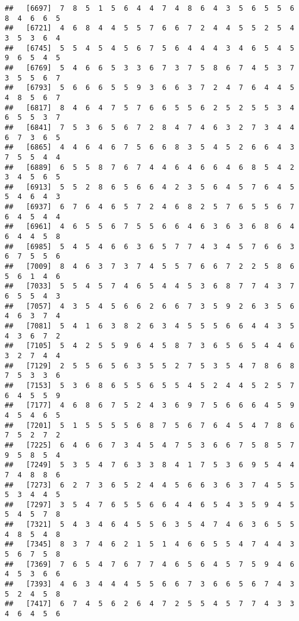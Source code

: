 \documentclass[
]{book}
\begin{document}
\begin{verbatim}
##   [6697]  7  8  5  1  5  6  4  4  7  4  8  6  4  3  5  6  5  5  6  8  4  6  6  5
##   [6721]  4  6  8  4  4  5  5  7  6  6  7  2  4  4  5  5  2  5  4  3  5  3  6  4
##   [6745]  5  5  4  5  4  5  6  7  5  6  4  4  4  3  4  6  5  4  5  9  6  5  4  5
##   [6769]  5  4  6  6  5  3  3  6  7  3  7  5  8  6  7  4  5  3  7  3  5  5  6  7
##   [6793]  5  6  6  6  5  5  9  3  6  6  3  7  2  4  7  6  4  4  5  4  8  5  6  7
##   [6817]  8  4  6  4  7  5  7  6  6  5  5  6  2  5  2  5  5  3  4  6  5  5  3  7
##   [6841]  7  5  3  6  5  6  7  2  8  4  7  4  6  3  2  7  3  4  4  6  7  3  6  5
##   [6865]  4  4  6  4  6  7  5  6  6  8  3  5  4  5  2  6  6  4  3  7  5  5  4  4
##   [6889]  6  5  5  8  7  6  7  4  4  6  4  6  6  4  6  8  5  4  2  3  4  5  6  5
##   [6913]  5  5  2  8  6  5  6  6  4  2  3  5  6  4  5  7  6  4  5  5  4  6  4  3
##   [6937]  6  7  6  4  6  5  7  2  4  6  8  2  5  7  6  5  5  6  7  6  4  5  4  4
##   [6961]  4  6  5  5  6  7  5  5  6  6  4  6  3  6  3  6  8  6  4  6  4  4  5  8
##   [6985]  5  4  5  4  6  6  3  6  5  7  7  4  3  4  5  7  6  6  3  6  7  5  5  6
##   [7009]  8  4  6  3  7  3  7  4  5  5  7  6  6  7  2  2  5  8  6  5  6  1  4  6
##   [7033]  5  5  4  5  7  4  6  5  4  4  5  3  6  8  7  7  4  3  7  6  5  5  4  3
##   [7057]  4  3  5  4  5  6  6  2  6  6  7  3  5  9  2  6  3  5  6  4  6  3  7  4
##   [7081]  5  4  1  6  3  8  2  6  3  4  5  5  5  6  6  4  4  3  5  4  3  6  7  2
##   [7105]  5  4  2  5  5  9  6  4  5  8  7  3  6  5  6  5  4  4  6  3  2  7  4  4
##   [7129]  2  5  5  6  5  6  3  5  5  2  7  5  3  5  4  7  8  6  8  7  5  3  3  6
##   [7153]  5  3  6  8  6  5  5  6  5  5  4  5  2  4  4  5  2  5  7  6  4  5  5  9
##   [7177]  4  6  8  6  7  5  2  4  3  6  9  7  5  6  6  6  4  5  9  4  5  4  6  5
##   [7201]  5  1  5  5  5  5  6  8  7  5  6  7  6  4  5  4  7  8  6  7  5  2  7  2
##   [7225]  6  4  6  6  7  3  4  5  4  7  5  3  6  6  7  5  8  5  7  9  5  8  5  4
##   [7249]  5  3  5  4  7  6  3  3  8  4  1  7  5  3  6  9  5  4  4  7  4  8  8  6
##   [7273]  6  2  7  3  6  5  2  4  4  5  6  6  3  6  3  7  4  5  5  5  3  4  4  5
##   [7297]  3  5  4  7  6  5  5  6  6  4  4  6  5  4  3  5  9  4  5  5  4  5  7  8
##   [7321]  5  4  3  4  6  4  5  5  6  3  5  4  7  4  6  3  6  5  5  4  8  5  4  8
##   [7345]  8  3  7  4  6  2  1  5  1  4  6  6  5  5  4  7  4  4  3  5  6  7  5  8
##   [7369]  7  6  5  4  7  6  7  7  4  6  5  6  4  5  7  5  9  4  6  4  5  3  6  6
##   [7393]  4  6  3  4  4  4  5  5  6  6  7  3  6  6  5  6  7  4  3  5  2  4  5  8
##   [7417]  6  7  4  5  6  2  6  4  7  2  5  5  4  5  7  7  4  3  3  4  6  4  5  6

\end{verbatim}
\end{document}
